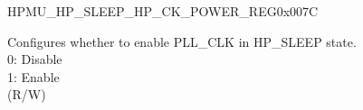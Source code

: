     \begin{register}{H}{PMU\_HP\_SLEEP\_HP\_CK\_POWER\_REG}{0x007C}\label{regdesc:PMUHPSLEEPHPCKPOWERREG}
    \regnewline%
    \begin{regdesc}\begin{reglist}
    \label{fielddesc:PMUHPSLEEPXPDBBPLL}\item [PMU\_HP\_SLEEP\_XPD\_BBPLL] Configures whether to  enable PLL\_CLK in HP\_SLEEP state.\\
0: Disable\\
1: Enable\\
(R/W)
    \end{reglist}\end{regdesc}
    \end{register}


